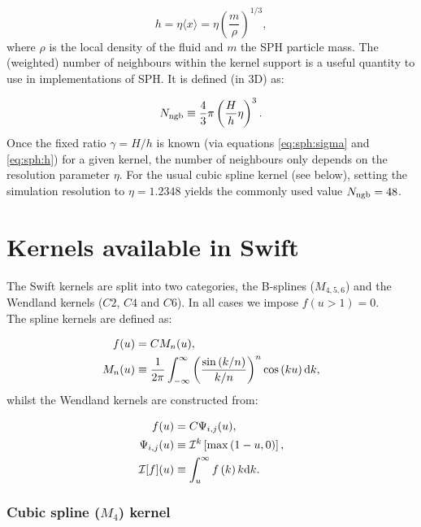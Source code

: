 \documentclass[fleqn, usenatbib, useAMS,a4paper]{mnras}
\newcommand{\swift}{{\sc Swift}\xspace}
\begin{document}
\begin{equation}
  h = \eta \langle x \rangle = \eta \left(\frac{m}{\rho}\right)^{1/3},
\end{equation}
where $\rho$ is the local density of the fluid and $m$ the SPH
particle mass. 
The (weighted) number of neighbours within the kernel support is a
useful quantity to use in implementations of SPH. It is defined (in
3D) as:

\begin{equation}
  N_{\rm ngb} \equiv \frac{4}{3}\pi \left(\frac{H}{h}\eta\right)^3.
\end{equation}
Once the fixed ratio $\gamma= H/h$ is known (via equations
\ref{eq:sph:sigma} and \ref{eq:sph:h}) for a given kernel, the number
of neighbours only depends on the resolution parameter $\eta$.  For
the usual cubic spline kernel (see below), setting the simulation
resolution to $\eta=1.2348$ yields the commonly used value $N_{\rm
  ngb} = 48$.

\section{Kernels available in \swift}

The \swift kernels are split into two categories, the B-splines
($M_{4,5,6}$) and the Wendland kernels ($C2$, $C4$ and $C6$). In all
cases we impose $f(u>1) = 0$.\\
The spline kernels are defined as:

\begin{align}
  f(u) &= C M_n(u), \nonumber\\
  M_n(u) &\equiv \frac{1}{2\pi}
  \int_{-\infty}^{\infty}
  \left(\frac{\sin\left(k/n\right)}{k/n}\right)^n\cos\left(ku\right){\rm
  d}k \nonumber,
\end{align}
whilst the Wendland kernels are constructed from:

\begin{align}
  f(u) &= C \Psi_{i,j}(u), \nonumber\\
  \Psi_{i,j}(u) &\equiv
  \mathcal{I}^k\left[\max\left(1-u,0\right)\right], \nonumber\\
  \mathcal{I}[f](u) &\equiv \int_u^\infty f\left(k\right)k{\rm d}k. \nonumber
\end{align}

\subsubsection{Cubic spline ($M_4$) kernel}
\end{document}
